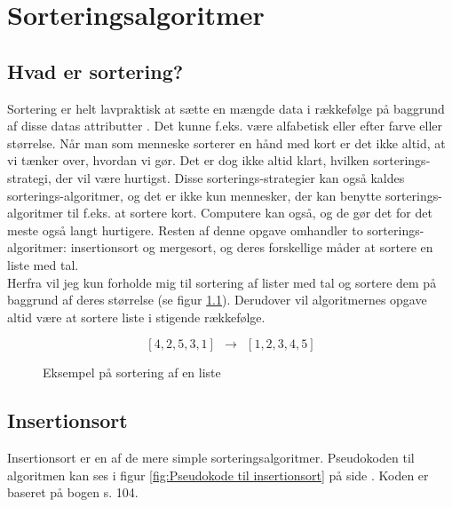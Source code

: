 	\chapter{Sorteringsalgoritmer} \label{ch:Sorteringsalgoritmer}

	\section{Hvad er sortering?}
	\label{sec:Hvad er sortering?}



	Sortering er helt lavpraktisk at sætte en mængde data i rækkefølge på baggrund af disse datas attributter \cite{what-is-sorting}. Det kunne f.eks. være alfabetisk eller efter farve eller størrelse. Når man som menneske sorterer en hånd med kort er det ikke altid, at vi tænker over, hvordan vi gør. Det er dog ikke altid klart, hvilken sorterings-strategi, der vil være hurtigst. Disse sorterings-strategier kan også kaldes sorterings-algoritmer, og det er ikke kun mennesker, der kan benytte sorterings-algoritmer til f.eks. at sortere kort. Computere kan også, og de gør det for det meste også langt hurtigere. Resten af denne opgave omhandler to sorterings-algoritmer: insertionsort og mergesort, og deres forskellige måder at sortere en liste med tal.\\

	Herfra vil jeg kun forholde mig til sortering af lister med tal og sortere dem på baggrund af deres størrelse (se figur \ref{fig:Eksempel på sortering af en liste}). Derudover vil algoritmernes opgave altid være at sortere liste i stigende rækkefølge.

	\begin{figure}[h]
		\begin{center}
			$$[4,2,5,3,1] \:\:\longrightarrow\:\: [1,2,3,4,5]$$
		\end{center}
		\caption{Eksempel på sortering af en liste}
		\label{fig:Eksempel på sortering af en liste}
	\end{figure}


	\section{Insertionsort}
	\label{sec:Insertionsort}

	Insertionsort er en af de mere simple sorteringsalgoritmer. Pseudokoden til algoritmen kan ses i figur \ref{fig:Pseudokode til insertionsort} på side \pageref{fig:Pseudokode til insertionsort}. Koden er baseret på bogen  \cite{aogd} s. 104.\\


